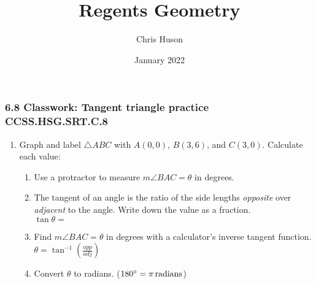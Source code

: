 \documentclass[12pt, twoside]{article}
\title{Regents Geometry}
\author{Chris Huson}
\date{January 2022}
\begin{document}
\subsubsection*{6.8 Classwork: Tangent triangle practice \hfill CCSS.HSG.SRT.C.8}
\begin{enumerate}
\item Graph and label $\triangle ABC$ with $A(0,0)$, $B(3,6)$, and $C(3,0)$. Calculate each value:
  \begin{enumerate}[itemsep=1.25cm]  
    \item Use a protractor to measure $m\angle BAC= \theta$ in degrees.
    \item The tangent of an angle is the ratio of the side lengths \emph{opposite} over \emph{adjacent} to the angle. Write down the value as a fraction.\\[0.5cm]
      $\tan  \theta=$
    \item Find $m\angle BAC=\theta$ in degrees with a calculator's inverse tangent function.\\ $\displaystyle \theta = \tan^{-1}(\frac{opp}{adj})$
    \item Convert $ \theta$ to radians. ($180^\circ=\pi \, \rm{radians}$)
  \end{enumerate}

\newpage

\end{enumerate}
\end{document}
